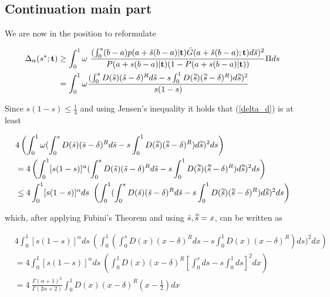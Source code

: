 \documentclass{article}
\newcommand{\dbtilde}[1]{\accentset{\approx}{#1}}
\begin{document}
 \subsection*{Continuation main part}
 We are now in the position to reformulate
 
 \begin{align}
     \Delta_{\alpha}(s^*; \mathbf{t}) &\geq \int_0^1 \omega \ \frac{(\int_0^s (b-a)p(a+\tilde{s} (b-a) | \mathbf{t}) \bar{G} (a+\tilde{s} (b-a) ; \mathbf{t}) d \tilde{s})^2}{P(a+s(b-a)|\mathbf{t}) (1- P(a+s(b-a)|\mathbf{t}))} \Pi ds \nonumber \\
     &= \int_0^1 \omega \frac{(\int_0^s D(\tilde{s}) (\tilde{s} - \delta)^R d\tilde{s} - s \int_0^1 D(\dbtilde{s}) (\dbtilde{s} - \delta)^R) d\dbtilde{s})^2}{s(1-s)} \label{delta_d} \\
 \end{align}
 
 Since $s(1-s) \leq \frac{1}{4}$ and using Jensen's inequality it holds that (\ref{delta_d}) is at least
 
 \begin{align*}
     & 4 \left ( \int_0^1 \omega (\int_0^s D(\tilde{s}) (\tilde{s} - \delta)^R d\tilde{s} - s \int_0^1 D(\dbtilde{s}) (\dbtilde{s} - \delta)^R) d\dbtilde{s})^2 ds \right ) \\
     & = 4 \left ( \int_0^1 [s(1-s)]^{\alpha} (\int_0^s D(\tilde{s}) (\tilde{s} - \delta)^R d\tilde{s} - s \int_0^1 D(\dbtilde{s}) (\dbtilde{s} - \delta)^R) d\dbtilde{s})^2 ds \right ) \\
     & \leq 4 \int_0^1 [s(1-s)]^{\alpha} ds \ \left (\int_0^1 (\int_0^s D(\tilde{s}) (\tilde{s} - \delta)^R d\tilde{s} - s \int_0^1 D(\dbtilde{s}) (\dbtilde{s} - \delta)^R) d\dbtilde{s})^2 ds \right ) 
 \end{align*}
 
which, after applying Fubini's Theorem and using $\tilde{s}, \dbtilde{s} = x$, can be written as

\begin{align*}
    & 4 \int_0^1 [s(1-s)]^{\alpha} ds \ \left (\int_0^1 (\int_0^s D(x) (x - \delta)^R ds - s \int_0^1 D(x) (x - \delta)^R) ds)^2 dx \right ) \\
    &= 4 \int_0^1 [s(1-s)]^{\alpha} ds \ \left ( \int_0^1 D(x) (x - \delta)^R [\int_0^s ds - s \int_0^1 ds]^2 dx \right) \\
    &= 4 \ \frac{\Gamma (\alpha + 1)^2}{\Gamma (2\alpha + 2)} \int_0^1 D(x) (x - \delta)^R (x - \frac{1}{2}) dx
\end{align*}
\end{document}
